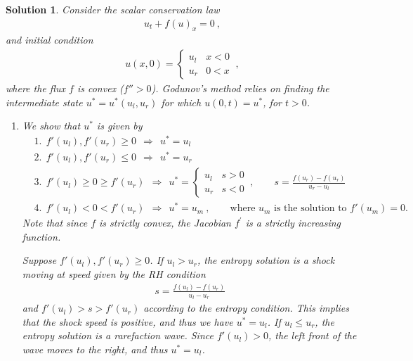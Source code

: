 \documentclass[10pt,letterpaper]{article}
\newcommand{\frb}[1]{ \left(  {#1} \right) }
\theoremstyle{break}
\newtheorem{solution}{Solution}
\begin{document}
\begin{solution}
    Consider the scalar conservation law
    \begin{gather}
        u_t+f(u)_x=0\ ,
    \end{gather}
    and initial condition
    \begin{align}
        u(x,0)=\begin{cases}
            u_l & x<0\\
            u_r & 0<x
        \end{cases}\ ,
    \end{align}
    where the flux $f$ is convex ($f''>0$).
    Godunov's method relies on finding the intermediate state $u^*=u^*(u_l,u_r)$ for which $u(0,t)=u^*$, for $t>0$.
    \begin{enumerate}
        \item
        We show that $u^*$ is given by
        \begin{align*}
            &1.\ \ f'(u_l), f'(u_r)\ge 0 \ \ \Longrightarrow \ \ u^*=u_l \\
            &2.\ \ f'(u_l), f'(u_r)\le 0 \ \ \Longrightarrow \ \ u^*=u_r \\[0.5em]
            &3.\ \ f'(u_l) \ge 0\ge f'(u_r) \ \ \Longrightarrow \ \
                u^*=\begin{cases}
                    u_l & s>0 \\
                    u_r & s<0
                \end{cases}\ ,
                \qquad s=\frac{f(u_r)-f(u_r)}{u_r-u_l}\\[0.5em]
            &4.\ \ f'(u_l) < 0 < f'(u_r)  \ \ \Longrightarrow \ \ u^*=u_m\ ,
                \qquad\text{where $u_m$ is the solution to $f'\frb{u_m}=0$.}
        \end{align*}
        Note that since $f$ is strictly convex, the Jacobian $f^\prime$ is a strictly increasing function.

        Suppose $f'(u_l), f'(u_r)\ge 0$.
        If $u_l>u_r$, the entropy solution is a shock moving at speed given by the RH condition
        \begin{gather} \label{RHJumpCond}
            s=\frac{f(u_l)-f(u_r)}{u_l-u_r}\,
        \end{gather}
        and $f'(u_l) > s > f'(u_r)$ according to the entropy condition.
        This implies that the shock speed is positive, and thus we have $u^*=u_l$. 
        If $u_l\le u_r$, the entropy solution is a rarefaction wave.
        Since $f'(u_l)>0$, the left front of the wave moves to the right, and thus $u^*=u_l$.


\end{enumerate}
\end{solution}
\end{document}
